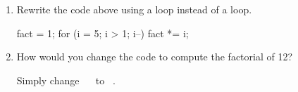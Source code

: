 \begin{enumerate}

\item Rewrite the code above using a  loop instead of a  loop.

\begin{answer}[5em]
\begin{javaans}
fact = 1;
for (i = 5; i > 1; i--) {
    fact *= i;
}
\end{javaans}
\end{answer}

\item How would you change the code to compute the factorial of 12?

\begin{answer}[2em]
Simply change ~ ~to ~.
\end{answer}

\end{enumerate}
